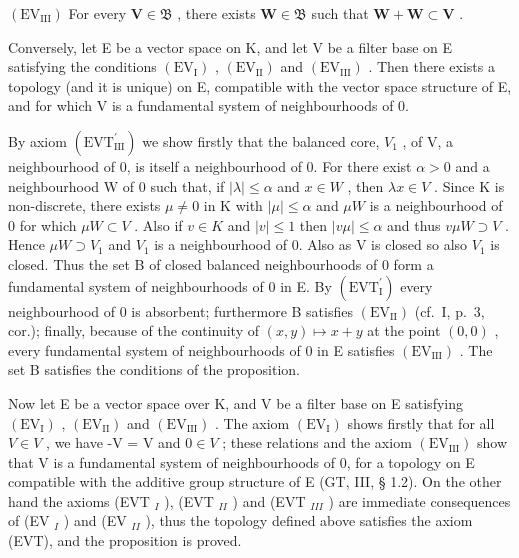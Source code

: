 \((\mathrm{EV}_{\mathrm{III}})\) For every \(\mathbf{V}\in \mathfrak{B}\) , there exists \(\mathbf{W}\in \mathfrak{B}\) such that \(\mathbf{W} + \mathbf{W}\subset \mathbf{V}\) .

Conversely, let E be a vector space on K, and let V be a filter base on E satisfying the conditions \((\mathrm{EV}_{\mathrm{I}})\) , \((\mathrm{EV}_{\mathrm{II}})\) and \((\mathrm{EV}_{\mathrm{III}})\) . Then there exists a topology (and it is unique) on E, compatible with the vector space structure of E, and for which V is a fundamental system of neighbourhoods of 0.

By axiom \((\mathrm{EVT}_{\mathrm{III}}^{\prime})\) we show firstly that the balanced core, \(V_{1}\) , of V, a neighbourhood of 0, is itself a neighbourhood of 0. For there exist \(\alpha > 0\) and a neighbourhood W of 0 such that, if \(|\lambda| \leqslant \alpha\) and \(x \in W\) , then \(\lambda x \in V\) . Since K is non-discrete, there exists \(\mu \neq 0\) in K with \(|\mu| \leqslant \alpha\) and \(\mu W\) is a neighbourhood of 0 for which \(\mu W \subset V\) . Also if \(v \in K\) and \(|v| \leqslant 1\) then \(|v\mu| \leqslant \alpha\) and thus \(v\mu W \supset V\) . Hence \(\mu W \supset V_{1}\) and \(V_{1}\) is a neighbourhood of 0. Also as V is closed so also \(V_{1}\) is closed. Thus the set B of closed balanced neighbourhoods of 0 form a fundamental system of neighbourhoods of 0 in E. By \((\mathrm{EVT}_{\mathrm{I}}^{\prime})\) every neighbourhood of 0 is absorbent; furthermore B satisfies \((\mathrm{EV}_{\mathrm{II}})\) (cf.~I, p.~3, cor.); finally, because of the continuity of \((x, y) \mapsto x + y\) at the point \((0, 0)\) , every fundamental system of neighbourhoods of 0 in E satisfies \((\mathrm{EV}_{\mathrm{III}})\) . The set B satisfies the conditions of the proposition.

Now let E be a vector space over K, and V be a filter base on E satisfying \((\mathrm{EV}_{\mathrm{I}})\) , \((\mathrm{EV}_{\mathrm{II}})\) and \((\mathrm{EV}_{\mathrm{III}})\) . The axiom \((\mathrm{EV}_{\mathrm{I}})\) shows firstly that for all \(V \in V\) , we have -V = V and \(0 \in V\) ; these relations and the axiom \((\mathrm{EV}_{\mathrm{III}})\) show that V is a fundamental system of neighbourhoods of 0, for a topology on E compatible with the additive group structure of E (GT, III, § 1.2). On the other hand the axioms (EVT \(_{I}\) ), (EVT \(_{II}\) ) and (EVT \(_{III}\) ) are immediate consequences of (EV \(_{I}\) ) and (EV \(_{II}\) ), thus the topology defined above satisfies the axiom (EVT), and the proposition is proved.

